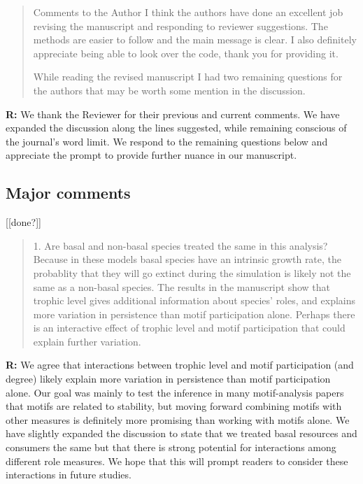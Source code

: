 \documentclass[12pt]{article}
\begin{document}
  \begin{quotation}
    Comments to the Author
    I think the authors have done an excellent job revising the manuscript and responding to reviewer suggestions. The methods are easier to follow and the main message is clear. I also definitely appreciate being able to look over the code, thank you for providing it.   

    While reading the revised manuscript I had two remaining questions for the authors that may be worth some mention in the discussion. 

  \end{quotation}

  \smallskip

  \textbf{R:} We thank the Reviewer for their previous and current comments. We have expanded the discussion along the lines suggested, while remaining conscious of the journal's word limit. We respond to the remaining questions below and appreciate the prompt to provide further nuance in our manuscript.

  \smallskip

  \subsection*{Major comments} [[done?]]

    \begin{quotation}
      1. Are basal and non-basal species treated the same in this analysis? Because in these models basal species have an intrinsic growth rate, the probablity that they will go extinct during the simulation is likely not the same as a non-basal species. The results in the manuscript show that trophic level gives additional information about species' roles, and explains more variation in persistence than motif participation alone. Perhaps there is an interactive effect of trophic level and motif participation that could explain further variation.
    \end{quotation}

    \smallskip

    \textbf{R:} We agree that interactions between trophic level and motif participation (and degree) likely explain more variation in persistence than motif participation alone. Our goal was mainly to test the inference in many motif-analysis papers that motifs are related to stability, but moving forward combining motifs with other measures is definitely more promising than working with motifs alone. We have slightly expanded the discussion to state that we treated basal resources and consumers the same but that there is strong potential for interactions among different role measures. We hope that this will prompt readers to consider these interactions in future studies.
\end{document}
